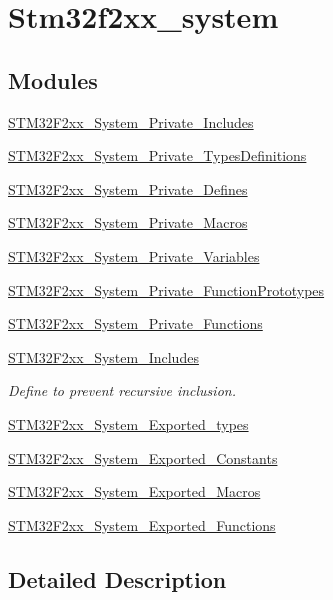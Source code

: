 \hypertarget{group__stm32f2xx__system}{\section{Stm32f2xx\-\_\-system}
\label{group__stm32f2xx__system}
}
\subsection*{Modules}
\begin{DoxyCompactItemize}
\item 
\hyperlink{group___s_t_m32_f2xx___system___private___includes}{S\-T\-M32\-F2xx\-\_\-\-System\-\_\-\-Private\-\_\-\-Includes}
\item 
\hyperlink{group___s_t_m32_f2xx___system___private___types_definitions}{S\-T\-M32\-F2xx\-\_\-\-System\-\_\-\-Private\-\_\-\-Types\-Definitions}
\item 
\hyperlink{group___s_t_m32_f2xx___system___private___defines}{S\-T\-M32\-F2xx\-\_\-\-System\-\_\-\-Private\-\_\-\-Defines}
\item 
\hyperlink{group___s_t_m32_f2xx___system___private___macros}{S\-T\-M32\-F2xx\-\_\-\-System\-\_\-\-Private\-\_\-\-Macros}
\item 
\hyperlink{group___s_t_m32_f2xx___system___private___variables}{S\-T\-M32\-F2xx\-\_\-\-System\-\_\-\-Private\-\_\-\-Variables}
\item 
\hyperlink{group___s_t_m32_f2xx___system___private___function_prototypes}{S\-T\-M32\-F2xx\-\_\-\-System\-\_\-\-Private\-\_\-\-Function\-Prototypes}
\item 
\hyperlink{group___s_t_m32_f2xx___system___private___functions}{S\-T\-M32\-F2xx\-\_\-\-System\-\_\-\-Private\-\_\-\-Functions}
\item 
\hyperlink{group___s_t_m32_f2xx___system___includes}{S\-T\-M32\-F2xx\-\_\-\-System\-\_\-\-Includes}
\begin{DoxyCompactList}\small\item\em Define to prevent recursive inclusion. \end{DoxyCompactList}\item 
\hyperlink{group___s_t_m32_f2xx___system___exported__types}{S\-T\-M32\-F2xx\-\_\-\-System\-\_\-\-Exported\-\_\-types}
\item 
\hyperlink{group___s_t_m32_f2xx___system___exported___constants}{S\-T\-M32\-F2xx\-\_\-\-System\-\_\-\-Exported\-\_\-\-Constants}
\item 
\hyperlink{group___s_t_m32_f2xx___system___exported___macros}{S\-T\-M32\-F2xx\-\_\-\-System\-\_\-\-Exported\-\_\-\-Macros}
\item 
\hyperlink{group___s_t_m32_f2xx___system___exported___functions}{S\-T\-M32\-F2xx\-\_\-\-System\-\_\-\-Exported\-\_\-\-Functions}
\end{DoxyCompactItemize}


\subsection{Detailed Description}
